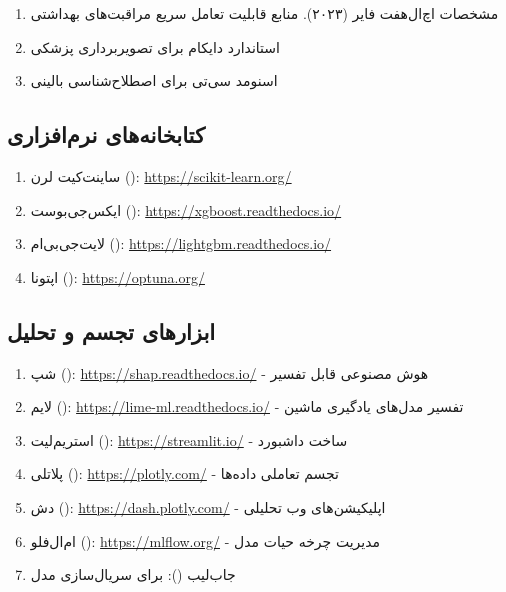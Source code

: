 \documentclass[12pt,a4paper]{article}
\begin{document}
\begin{enumerate}[topsep=0.5em, itemsep=0.8em]
\item مشخصات اچ‌ال‌هفت فایر (۲۰۲۳). منابع قابلیت تعامل سریع مراقبت‌های بهداشتی
\item استاندارد دایکام برای تصویربرداری پزشکی
\item اسنومد سی‌تی برای اصطلاح‌شناسی بالینی
\end{enumerate}

\subsection{کتابخانه‌های نرم‌افزاری}\label{subsec:software_libraries}

\begin{enumerate}[topsep=0.5em, itemsep=0.8em]
\item ساینت‌کیت لرن (): \url{https://scikit-learn.org/}
\item ایکس‌جی‌بوست (): \url{https://xgboost.readthedocs.io/}
\item لایت‌جی‌بی‌ام (): \url{https://lightgbm.readthedocs.io/}
\item اپتونا (): \url{https://optuna.org/}
\end{enumerate}

\subsection{ابزارهای تجسم و تحلیل}\label{subsec:visualization_tools}

\begin{enumerate}[topsep=0.5em, itemsep=0.8em]
\item شپ (): \url{https://shap.readthedocs.io/} - هوش مصنوعی قابل تفسیر
\item لایم (): \url{https://lime-ml.readthedocs.io/} - تفسیر مدل‌های یادگیری ماشین
\item استریم‌لیت (): \url{https://streamlit.io/} - ساخت داشبورد
\item پلاتلی (): \url{https://plotly.com/} - تجسم تعاملی داده‌ها
\item دش (): \url{https://dash.plotly.com/} - اپلیکیشن‌های وب تحلیلی
\item ام‌ال‌فلو (): \url{https://mlflow.org/} - مدیریت چرخه حیات مدل
\item جاب‌لیب (): برای سریال‌سازی مدل
\end{enumerate}
\end{document}
